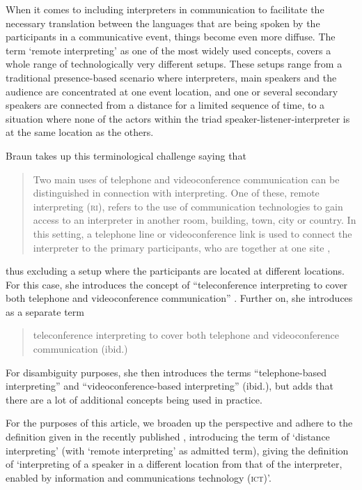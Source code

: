 \documentclass[output=paper]{langsci/langscibook}
\begin{document}
When it comes to including interpreters in communication to facilitate the necessary translation between the languages that are being spoken by the participants in a communicative event, things become even more diffuse. The term ‘remote interpreting’ as one of the most widely used concepts, covers a whole range of technologically very different setups. These setups range from a traditional presence-based scenario where interpreters, main speakers and the audience are concentrated at one event location, and one or several secondary speakers are connected from a distance for a limited sequence of time, to a situation where none of the actors within the triad speaker-listener-interpreter is at the same location as the others. 

Braun takes up this terminological challenge saying that 

\begin{quote}
Two main uses of telephone and videoconference communication can be distinguished in connection with interpreting. One of these, {remote interpreting (\textsc{ri})}, refers to the use of communication technologies to gain access to an interpreter in another room, building, town, city or country. In this setting, a telephone line or videoconference link is used to connect the interpreter to the primary participants, who are together at one site \citep[1]{Braun2015},
\end{quote}

thus excluding a setup where the participants are located at different locations. For this case, she introduces the concept of “{teleconference interpreting} to cover both telephone and videoconference communication” \citep[2]{Braun2015}. Further on, she introduces as a separate term

\begin{quote}
	{teleconference interpreting} to cover both telephone and videoconference communication (ibid.)
\end{quote}

For disambiguity purposes, she then introduces the terms “{telephone-based interpreting}” and “{videoconference-based interpreting}” (ibid.), but adds that there are a lot of additional concepts being used in practice.

For the purposes of this article, we broaden up the perspective and adhere to the definition given in the recently published \citet{ISO20108}, introducing the term of ‘distance interpreting’ (with ‘remote interpreting’ as admitted term), giving the definition of ‘interpreting of a speaker in a different location from that of the interpreter, enabled by information and communications technology (\textsc{ict})’. 
\end{document}
